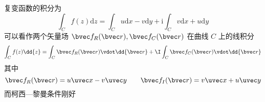 
\begin{issues}
\issueDraft
\end{issues}

复变函数的积分为
\begin{equation}
\int_{C} f(z) \mathrm{d} z=\int_{C} u \mathrm{d} x-v \mathrm{d} y+\mathrm{i} \int_{C} v \mathrm{d} x+u \mathrm{d} y
\end{equation}
可以看作两个矢量场 $\bvec f_R(\bvec r), \bvec f_C(\bvec r)$ 在曲线 $C$ 上的线积分
\begin{equation}
\int_{C} f(z) \dd{z} = \int_C \bvec f_R(\bvec r) \vdot \dd{\bvec r} + \I \int_C \bvec f_C(\bvec r) \vdot \dd{\bvec r}
\end{equation}
其中
\begin{equation}
\bvec f_R(\bvec r) = u\uvec x - v\uvec y
\qquad
\bvec f_I(\bvec r) = v\uvec x + u\uvec y
\end{equation}
而柯西—黎曼条件刚好
